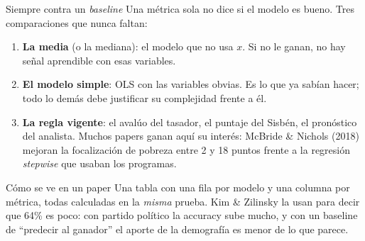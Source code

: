 \documentclass{beamer}
\newcommand{\1}{\mathbb{I}}
\begin{document}
\begin{frame}{Siempre contra un \emph{baseline}}
\small
Una métrica sola no dice si el modelo es bueno. Tres comparaciones que nunca faltan:
\pause
\begin{enumerate}\itemsep5pt
  \item \textbf{La media} (o la mediana): el modelo que no usa $x$. Si no le ganan, no hay señal aprendible con esas variables. \pause
  \item \textbf{El modelo simple}: OLS con las variables obvias. Es lo que ya sabían hacer; todo lo demás debe justificar su complejidad frente a él. \pause
  \item \textbf{La regla vigente}: el avalúo del tasador, el puntaje del Sisbén, el pronóstico del analista. Muchos papers ganan aquí su interés: McBride \& Nichols (2018) mejoran la focalización de pobreza entre 2 y 18 puntos frente a la regresión \emph{stepwise} que usaban los programas. \pause
\end{enumerate}
\vspace{0.1cm}
\begin{block}{Cómo se ve en un paper}
Una tabla con una fila por modelo y una columna por métrica, todas calculadas en la \emph{misma} prueba. Kim \& Zilinsky la usan para decir que 64\% es poco: con partido político la accuracy sube mucho, y con un baseline de ``predecir al ganador'' el aporte de la demografía es menor de lo que parece.
\end{block}
\end{frame}
\end{document}
